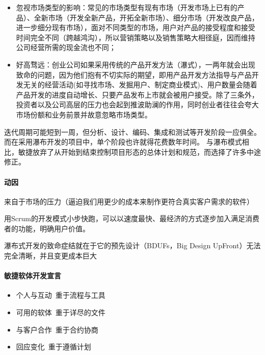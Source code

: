 \documentclass[letterpaper,11pt,english]{sphinxmanual}
\begin{document}
\begin{itemize}
\item {} 
忽视市场类型的影响：常见的市场类型有现有市场（开发市场上已有的产品）、全新市场（开发全新产品，开拓全新市场）、细分市场（开发改良产品，进一步细分现有市场），面对不同类型的市场，用户对产品的接受程度和接受时间完全不同（跨越鸿沟），所以营销策略以及销售策略大相径庭，因而维持公司经营所需的现金流也不同；

\item {} 
好高骛远：创业公司如果采用传统的产品开发方法（瀑式），一两年就会出现致命的问题，因为他们抱有不切实际的期望，即用产品开发方法指导与产品开发无关的经营活动(如寻找市场、发掘用户、制定商业模式)、用户数量会随着产品开发的进度自动增长、只要产品发布上市就会被用户接受。除了三条外，投资者以及公司高层的压力也会起到推波助澜的作用，同时创业者往往会夸大市场份额和业务前景并故意忽略市场类型。

\end{itemize}

迭代周期可能短到一周，但分析、设计、编码、集成和测试等开发阶段一应俱全。而在采用瀑布开发的项目中，单个阶段也许就得花费数年时间。
与瀑布模式相比，敏捷放弃了从开始到结束控制项目形态的总体计划和规范，而选择了许多中途修正。


\paragraph{动因}
\label{\detokenize{chapter_project/Scrum:id2}}
来自于市场的压力（逼迫我们用更少的成本来制作更符合真实客户需求的软件）

用Scrum的开发模式小步快跑，可以以速度最快、最经济的方式逐步加入满足消费者的功能，明确用户价值。

瀑布式开发的致命症结就在于它的预先设计（BDUFs，Big Design
Up\sphinxhyphen{}Front）无法完全清晰，并且变更成本巨大


\paragraph{敏捷软体开发宣言}
\label{\detokenize{chapter_project/Scrum:id3}}\begin{itemize}
\item {} 
个人与互动 重于流程与工具

\item {} 
可用的软体 重于详尽的文件

\item {} 
与客户合作 重于合约协商

\item {} 
回应变化 重于遵循计划

\end{itemize}
\end{document}
